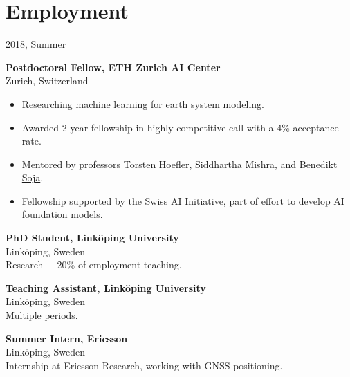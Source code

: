 \section*{Employment}
\newcommand{\employed}[5]{%
\item [#2] \textbf{#1, #3}\\%
    {\footnotesize#4}\\%
    #5
}
\begin{labeling}{2018, Summer}
    \employed{Postdoctoral Fellow}{2025 --}{ETH Zurich AI Center}{Zurich, Switzerland}{%
        \vspace{-2em}%
        \begin{itemize}
            \item Researching machine learning for earth system modeling.
            \item Awarded 2-year fellowship in highly competitive call with a 4\% acceptance rate.
            \item Mentored by professors \href{https://htor.inf.ethz.ch/}{Torsten Hoefler}, \href{https://camlab.ethz.ch/the-group/group-head.html}{Siddhartha Mishra}, and \href{https://space.igp.ethz.ch/people/person-detail.soja.html}{Benedikt Soja}.
            \item Fellowship supported by the Swiss AI Initiative, part of effort to develop AI foundation models.
        \end{itemize}}
    \employed{PhD Student}{2020 -- 2025}{Linköping University}{Linköping, Sweden}{Research + 20\% of employment teaching.}
    \employed{Teaching Assistant}{2016 -- 2019}{Linköping University}{Linköping, Sweden}{Multiple periods.}
    \employed{Summer Intern}{2018, Summer}{Ericsson}{Linköping, Sweden}{Internship at Ericsson Research, working with GNSS positioning.}
\end{labeling}
